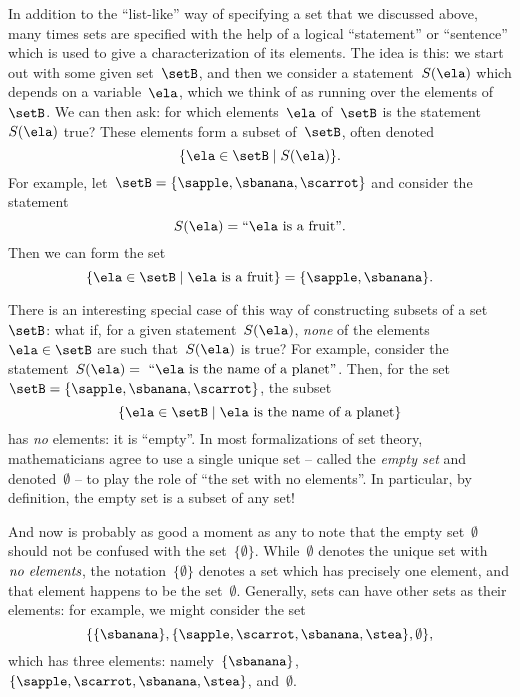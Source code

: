 In addition to the ``list-like'' way of specifying a set that we discussed above, many times sets are specified with the help of a logical ``statement'' or ``sentence'' which is used to give a characterization of its elements.
The idea is this: we start out with some given set~$\setB$, and then we consider a statement~$S(\ela)$ which depends on a variable~$\ela$, which we think of as running over the elements of~$\setB$.
We can then ask: for which elements~$\ela$ of~$\setB$ is the statement~$S(\ela)$ true?
These elements form a subset of~$\setB$, often denoted
\begin{equation}
	\label{eq:axiom-specialization}
	\{ \ela \in \setB \mid S(\ela) \}.
\end{equation}
For example, let~$\setB = \{ \sapple, \sbanana, \scarrot \}$ and consider the statement
\begin{equation*}
	S(\ela) = \text{``} \ela \text{ is a fruit''}.
\end{equation*}
Then we can form the set
\begin{equation*}
	\{ \ela \in \setB \mid \ela \text{ is a fruit} \} = \{ \sapple, \sbanana \}.
\end{equation*}

There is an interesting special case of this way of constructing subsets of a set~$\setB$:
what if, for a given statement~$S(\ela)$, \emph{none} of the elements~$\ela \in \setB$ are such that~$S(\ela)$ is true?
For example, consider the statement~$S(\ela) =\text{ ``} \ela \text{ is the name of a planet''}$.
Then, for the set~$\setB = \{ \sapple, \sbanana, \scarrot \}$, the subset
\begin{equation*}
	\{ \ela \in \setB \mid \ela \text{ is the name of a planet} \}
\end{equation*}
has \emph{no} elements: it is ``empty''.
In most formalizations of set theory, mathematicians agree to use a single unique set -- called the \emph{empty set} and denoted~$\emptyset$ -- to play the role of ``the set with no elements''.
In particular, by definition, the empty set is a subset of any set!

And now is probably as good a moment as any to note that the empty set~$\emptyset$ should not be confused with the set~$\{ \emptyset \}$.
While~$\emptyset$ denotes the unique set with~$\emph{no elements}$, the notation~$\{ \emptyset \}$ denotes a set which has precisely one element, and that element happens to be the set~$\emptyset$.
Generally, sets can have other sets as their elements: for example, we might consider the set
\begin{equation*}
	\{ \{ \sbanana \}, \{ \sapple, \scarrot, \sbanana, \stea \}, \emptyset \},
\end{equation*}
which has three elements: namely~$\{ \sbanana \}$,~$\{ \sapple, \scarrot, \sbanana, \stea \}$, and~$\emptyset$.

